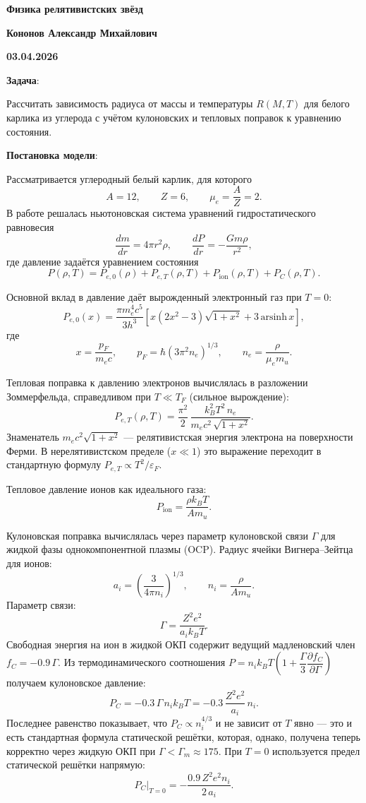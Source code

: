 \documentclass[12pt]{article}
\begin{document}
\begin{large}
\begin{center}
\LARGE \textbf{Физика релятивистских звёзд}
\par
\LARGE \textbf{Кононов Александр Михайлович}
\par
\textbf{03.04.2026}
\end{center}

\par \textbf{Задача}:
\par Рассчитать зависимость радиуса от массы и температуры $R(M,T)$ для белого карлика из углерода с учётом кулоновских и тепловых поправок к уравнению состояния.

\par \textbf{Постановка модели}:
\par Рассматривается углеродный белый карлик, для которого
\[
A=12,\qquad Z=6,\qquad \mu_e=\frac{A}{Z}=2.
\]
В работе решалась ньютоновская система уравнений гидростатического равновесия
\[
\frac{dm}{dr} = 4\pi r^2 \rho,
\qquad
\frac{dP}{dr} = -\frac{Gm\rho}{r^2},
\]
где давление задаётся уравнением состояния
\[
P(\rho,T)=P_{e,0}(\rho)+P_{e,T}(\rho,T)+P_{\mathrm{ion}}(\rho,T)+P_C(\rho,T).
\]

\par Основной вклад в давление даёт вырожденный электронный газ при $T=0$:
\[
P_{e,0}(x)=
\frac{\pi m_e^4 c^5}{3h^3}
\left[
x(2x^2-3)\sqrt{1+x^2}+3\,\mathrm{arsinh}\,x
\right],
\]
где
\[
x=\frac{p_F}{m_ec},
\qquad
p_F=\hbar(3\pi^2 n_e)^{1/3},
\qquad
n_e=\frac{\rho}{\mu_e m_u}.
\]

\par Тепловая поправка к давлению электронов вычислялась в разложении Зоммерфельда,
справедливом при $T \ll T_F$ (сильное вырождение):
\[
P_{e,T}(\rho,T)=\frac{\pi^2}{2}\,\frac{k_B^2 T^2\, n_e}{m_e c^2\,\sqrt{1+x^2}}.
\]
Знаменатель $m_e c^2\sqrt{1+x^2}$ — релятивистская энергия электрона на поверхности Ферми.
В нерелятивистском пределе ($x\ll 1$) это выражение переходит в стандартную формулу
$P_{e,T}\propto T^2/\varepsilon_F$.

\par Тепловое давление ионов как идеального газа:
\[
P_{\mathrm{ion}}=\frac{\rho k_B T}{A m_u}.
\]

\par Кулоновская поправка вычислялась через параметр кулоновской связи $\Gamma$
для жидкой фазы однокомпонентной плазмы (OCP).
Радиус ячейки Вигнера--Зейтца для ионов:
\[
a_i = \left(\frac{3}{4\pi n_i}\right)^{1/3},\qquad n_i=\frac{\rho}{A m_u}.
\]
Параметр связи:
\[
\Gamma = \frac{Z^2 e^2}{a_i k_B T}.
\]
Свободная энергия на ион в жидкой ОКП содержит ведущий мадленовский член
$f_C = -0.9\,\Gamma$. Из термодинамического соотношения
$P = n_i k_B T\!\left(1 + \dfrac{\Gamma}{3}\dfrac{\partial f_C}{\partial \Gamma}\right)$
получаем кулоновское давление:
\[
P_C = -0.3\,\Gamma\, n_i k_B T
    = -0.3\,\frac{Z^2 e^2}{a_i}\,n_i.
\]
Последнее равенство показывает, что $P_C \propto n_i^{4/3}$ и не зависит от $T$
явно — это и есть стандартная формула статической решётки, которая, однако,
получена теперь корректно через жидкую ОКП при $\Gamma < \Gamma_m \approx 175$.
При $T=0$ используется предел статической решётки напрямую:
\[
P_C\big|_{T=0} = -\frac{0.9\,Z^2 e^2 n_i}{2\,a_i}.
\]


\end{large}
\end{document}
